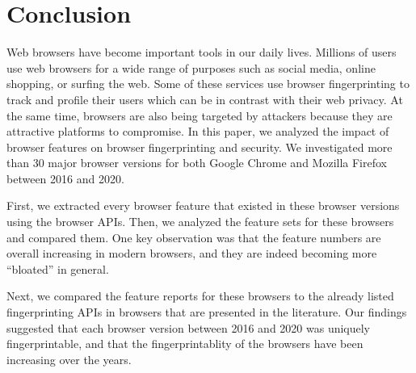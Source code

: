 \section{Conclusion}
\label{sec:conclusion}

Web browsers have become important tools in our daily lives.
Millions of users use web browsers for a wide range of purposes such
as social media, online shopping, or surfing the web. Some of these
services use browser fingerprinting to track and profile their users
which can be in contrast with their web privacy. At the same time,
browsers are also being targeted by attackers because they are
attractive platforms to compromise. In this paper, we analyzed the
impact of browser features on browser fingerprinting and security. We
investigated more than 30 major browser versions for both Google
Chrome and Mozilla Firefox between 2016 and 2020.

First, we extracted every browser feature that existed in these
browser versions using the browser APIs. Then, we analyzed the feature
sets for these browsers and compared them. One key observation was
that the feature numbers are overall increasing in modern browsers,
and they are indeed becoming more ``bloated'' in general.

Next, we compared the feature reports for these browsers to the
already listed fingerprinting APIs in browsers that are presented in the
literature. Our findings suggested that each browser version between 2016
and 2020 was uniquely fingerprintable, and that the fingerprintablity
of the browsers have been increasing over the years.

